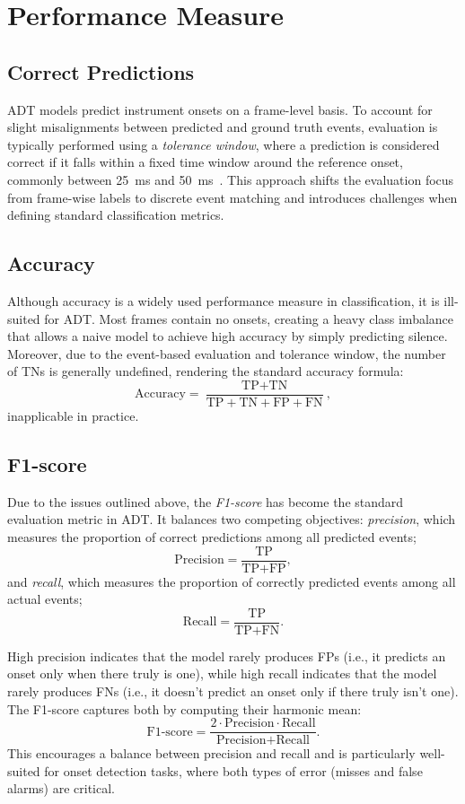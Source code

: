 \section{Performance Measure}

\subsection{Correct Predictions}

\gls{ADT} models predict instrument onsets on a frame-level basis. To account for slight misalignments between predicted and ground truth events, evaluation is typically performed using a \textit{tolerance window}, where a prediction is considered correct if it falls within a fixed time window around the reference onset, commonly between 25~ms and 50~ms~\cite{vogl2016recurrent}. This approach shifts the evaluation focus from frame-wise labels to discrete event matching and introduces challenges when defining standard classification metrics.

\subsection{Accuracy}

Although accuracy is a widely used performance measure in classification, it is ill-suited for \gls{ADT}. Most frames contain no onsets, creating a heavy class imbalance that allows a naive model to achieve high accuracy by simply predicting silence. Moreover, due to the event-based evaluation and tolerance window, the number of \glspl{TN} is generally undefined, rendering the standard accuracy formula:\[ \text{Accuracy} = \frac{\text{TP} + \text{TN}}{\text{TP} + \text{TN} + \text{FP} + \text{FN}},\] inapplicable in practice.

\subsection{F1-score}

Due to the issues outlined above, the \textit{F1-score} has become the standard evaluation metric in \gls{ADT}. It balances two competing objectives: \textit{precision}, which measures the proportion of correct predictions among all predicted events; \[ \text{Precision} = \frac{\text{TP}}{\text{TP} + \text{FP}},\] and \textit{recall}, which measures the proportion of correctly predicted events among all actual events; \[ \text{Recall} = \frac{\text{TP}}{\text{TP} + \text{FN}}. \]

High precision indicates that the model rarely produces \glspl{FP} (i.e., it predicts an onset only when there truly is one), while high recall indicates that the model rarely produces \glspl{FN} (i.e., it doesn't predict an onset only if there truly isn't one). The F1-score captures both by computing their harmonic mean: \[ \text{F1-score} = \frac{2 \cdot \text{Precision} \cdot \text{Recall}}{\text{Precision} + \text{Recall}}. \] This encourages a balance between precision and recall and is particularly well-suited for onset detection tasks, where both types of error (misses and false alarms) are critical.

